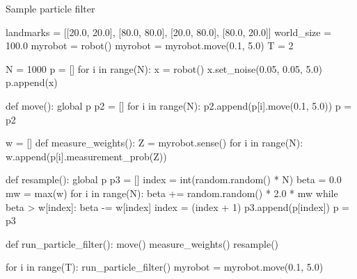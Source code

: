 \documentclass{report}
\begin{document}
\begin{algorithm}
\caption{Sample particle filter}
\label{ref:particlefilterpython}
\begin{python}
landmarks  = [[20.0, 20.0], [80.0, 80.0],
              [20.0, 80.0], [80.0, 20.0]]
world_size = 100.0
myrobot = robot()
myrobot = myrobot.move(0.1, 5.0)
T = 2

N = 1000
p = []
for i in range(N):
    x = robot()
    x.set_noise(0.05, 0.05, 5.0)
    p.append(x)

def move():
    global p
    p2 = []
    for i in range(N):
        p2.append(p[i].move(0.1, 5.0))
    p = p2

w = []
def measure_weights():
    Z = myrobot.sense()
    for i in range(N):
        w.append(p[i].measurement_prob(Z))

def resample():
    global p
    p3 = []
    index = int(random.random() * N)
    beta = 0.0
    mw = max(w)
    for i in range(N):
        beta += random.random() * 2.0 * mw
        while beta > w[index]:
            beta -= w[index]
            index = (index + 1) %
        p3.append(p[index])
    p = p3

def run_particle_filter():
    move()
    measure_weights()
    resample()

for i in range(T):
    run_particle_filter()
    myrobot = myrobot.move(0.1, 5.0)
\end{python}
\end{algorithm}
\end{document}
